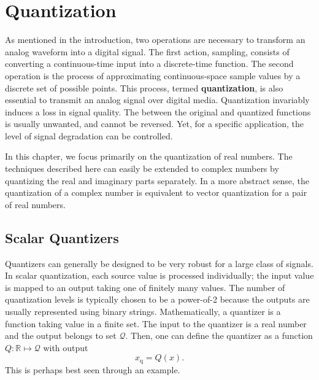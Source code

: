 \chapter{Quantization}
\label{chapter:Quantization}

As mentioned in the introduction, two operations are necessary to transform an analog waveform into a digital signal.
The first action, sampling, consists of converting a continuous-time input into a discrete-time function.
The second operation is the process of approximating continuous-space sample values by a discrete set of possible points.
This process, termed \textbf{quantization}, is also essential to transmit an analog signal over digital media.
Quantization invariably induces a loss in signal quality.
The  between the original and quantized functions is usually unwanted, and cannot be reversed.
Yet, for a specific application, the level of signal degradation can be controlled.

In this chapter, we focus primarily on the quantization of real numbers.
The techniques described here can easily be extended to complex numbers by quantizing the real and imaginary parts separately.
In a more abstract sense, the quantization of a complex number is equivalent to vector quantization for a pair of real numbers.


\section{Scalar Quantizers}

Quantizers can generally be designed to be very robust for a large class of signals.
In scalar quantization, each source value is processed individually; the input value is mapped to an output taking one of finitely many values.
The number of quantization levels is typically chosen to be a power-of-2 because the outputs are usually represented using binary strings.
Mathematically, a quantizer is a function taking value in a finite set.
The input to the quantizer is a real number and the output belongs to set $\mathcal{Q}$.
Then, one can define the quantizer as a function $Q : \mathbb{R} \mapsto \mathcal{Q}$ with output
\begin{equation*}
x_{\mathrm{q}} = Q(x) .
\end{equation*}
This is perhaps best seen through an example.


